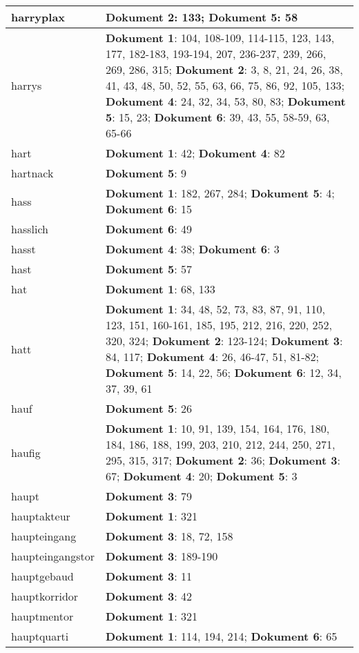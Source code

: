 \documentclass[a5paper]{article}
\begin{document}
\begin{longtable}[l]{|l|p{3in}|}
\hline
harryplax & \textbf{Dokument 2}: 133; \textbf{Dokument 5}: 58 \\
\hline
harrys & \textbf{Dokument 1}: 104, 108-109, 114-115, 123, 143, 177, 182-183, 193-194, 207, 236-237, 239, 266, 269, 286, 315; \textbf{Dokument 2}: 3, 8, 21, 24, 26, 38, 41, 43, 48, 50, 52, 55, 63, 66, 75, 86, 92, 105, 133; \textbf{Dokument 4}: 24, 32, 34, 53, 80, 83; \textbf{Dokument 5}: 15, 23; \textbf{Dokument 6}: 39, 43, 55, 58-59, 63, 65-66 \\
\hline
hart & \textbf{Dokument 1}: 42; \textbf{Dokument 4}: 82 \\
\hline
hartnack & \textbf{Dokument 5}: 9 \\
\hline
hass & \textbf{Dokument 1}: 182, 267, 284; \textbf{Dokument 5}: 4; \textbf{Dokument 6}: 15 \\
\hline
hasslich & \textbf{Dokument 6}: 49 \\
\hline
hasst & \textbf{Dokument 4}: 38; \textbf{Dokument 6}: 3 \\
\hline
hast & \textbf{Dokument 5}: 57 \\
\hline
hat & \textbf{Dokument 1}: 68, 133 \\
\hline
hatt & \textbf{Dokument 1}: 34, 48, 52, 73, 83, 87, 91, 110, 123, 151, 160-161, 185, 195, 212, 216, 220, 252, 320, 324; \textbf{Dokument 2}: 123-124; \textbf{Dokument 3}: 84, 117; \textbf{Dokument 4}: 26, 46-47, 51, 81-82; \textbf{Dokument 5}: 14, 22, 56; \textbf{Dokument 6}: 12, 34, 37, 39, 61 \\
\hline
hauf & \textbf{Dokument 5}: 26 \\
\hline
haufig & \textbf{Dokument 1}: 10, 91, 139, 154, 164, 176, 180, 184, 186, 188, 199, 203, 210, 212, 244, 250, 271, 295, 315, 317; \textbf{Dokument 2}: 36; \textbf{Dokument 3}: 67; \textbf{Dokument 4}: 20; \textbf{Dokument 5}: 3 \\
\hline
haupt & \textbf{Dokument 3}: 79 \\
\hline
hauptakteur & \textbf{Dokument 1}: 321 \\
\hline
haupteingang & \textbf{Dokument 3}: 18, 72, 158 \\
\hline
haupteingangstor & \textbf{Dokument 3}: 189-190 \\
\hline
hauptgebaud & \textbf{Dokument 3}: 11 \\
\hline
hauptkorridor & \textbf{Dokument 3}: 42 \\
\hline
hauptmentor & \textbf{Dokument 1}: 321 \\
\hline
hauptquarti & \textbf{Dokument 1}: 114, 194, 214; \textbf{Dokument 6}: 65 \\

\end{longtable}
\end{document}
